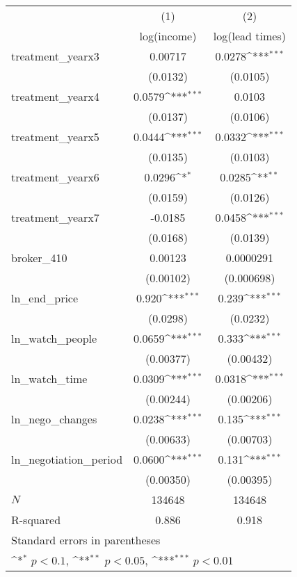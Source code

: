 {
\def\sym#1{\ifmmode^{#1}\else\(^{#1}\)\fi}
\begin{tabular}{l*{2}{c}}
\toprule
            &\multicolumn{1}{c}{(1)}&\multicolumn{1}{c}{(2)}\\
            &\multicolumn{1}{c}{log(income)}&\multicolumn{1}{c}{log(lead times)}\\
\midrule
treatment\_yearx3&     0.00717         &      0.0278\sym{***}\\
            &    (0.0132)         &    (0.0105)         \\
\addlinespace
treatment\_yearx4&      0.0579\sym{***}&      0.0103         \\
            &    (0.0137)         &    (0.0106)         \\
\addlinespace
treatment\_yearx5&      0.0444\sym{***}&      0.0332\sym{***}\\
            &    (0.0135)         &    (0.0103)         \\
\addlinespace
treatment\_yearx6&      0.0296\sym{*}  &      0.0285\sym{**} \\
            &    (0.0159)         &    (0.0126)         \\
\addlinespace
treatment\_yearx7&     -0.0185         &      0.0458\sym{***}\\
            &    (0.0168)         &    (0.0139)         \\
\addlinespace
broker\_410  &     0.00123         &   0.0000291         \\
            &   (0.00102)         &  (0.000698)         \\
\addlinespace
ln\_end\_price&       0.920\sym{***}&       0.239\sym{***}\\
            &    (0.0298)         &    (0.0232)         \\
\addlinespace
ln\_watch\_people&      0.0659\sym{***}&       0.333\sym{***}\\
            &   (0.00377)         &   (0.00432)         \\
\addlinespace
ln\_watch\_time&      0.0309\sym{***}&      0.0318\sym{***}\\
            &   (0.00244)         &   (0.00206)         \\
\addlinespace
ln\_nego\_changes&      0.0238\sym{***}&       0.135\sym{***}\\
            &   (0.00633)         &   (0.00703)         \\
\addlinespace
ln\_negotiation\_period&      0.0600\sym{***}&       0.131\sym{***}\\
            &   (0.00350)         &   (0.00395)         \\
\midrule
\(N\)       &      134648         &      134648         \\
R-squared   &       0.886         &       0.918         \\
\bottomrule
\multicolumn{3}{l}{\footnotesize Standard errors in parentheses}\\
\multicolumn{3}{l}{\footnotesize \sym{*} \(p<0.1\), \sym{**} \(p<0.05\), \sym{***} \(p<0.01\)}\\
\end{tabular}
}
